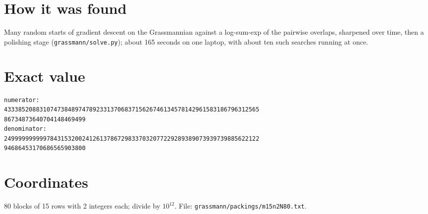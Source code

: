 \documentclass[11pt,a4paper]{article}
\begin{document}
\section{How it was found}
Many random starts of gradient descent on the Grassmannian against a log-sum-exp of the pairwise overlaps, sharpened over time, then a polishing stage (\texttt{grassmann/solve.py}); about 165 seconds on one laptop, with about ten such searches running at once.


\appendix
\section{Exact value}
{\small
\begin{verbatim}
numerator:
433385208831074738489747892331370683715626746134578142961583186796312565
86734873640704148469499
denominator:
249999999999784315320024126137867298337032077229289389073939739885622122
94686453170686565903800
\end{verbatim}}

\section{Coordinates}
80 blocks of 15 rows with 2 integers each; divide by $10^{12}$. File: \texttt{grassmann/packings/m15n2N80.txt}.
{\tiny
\begin{multicols}{4}
\end{multicols}}
\end{document}
